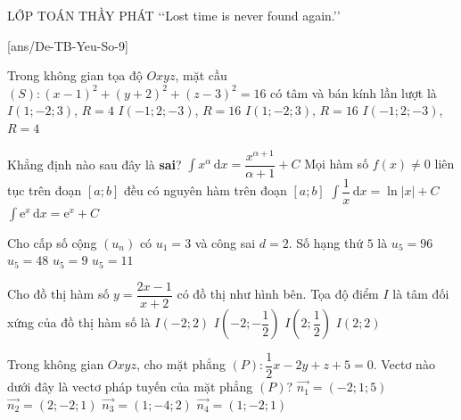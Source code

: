 \begin{name}
	{\tenchude}
	{\tendethi}
	{LỚP TOÁN THẦY PHÁT}
	{\lq\lq Lost time is never found again.\rq\rq}
\end{name}

[ans/De-TB-Yeu-So-9]
\TN
\begin{ex}
	Trong không gian tọa độ $Oxyz$, mặt cầu $(S)\colon {(x-1)}^2+{(y+2)}^2+{(z-3)}^2=16$ có tâm và bán kính lần lượt là
	\choice
	{\True $I(1;-2;3)$, $R=4$}
	{$I(-1;2;-3)$, $R=16$}
	{$I(1;-2;3)$, $R=16$}
	{$I(-1;2;-3)$, $R=4$}
\end{ex}

\begin{ex}
	Khẳng định nào sau đây là \textbf{sai}?
	\choice
	{\True $\displaystyle\int x^{\alpha}\mathrm{\,d}x=\dfrac{x^{\alpha+1}}{\alpha+1}+C$}
	{Mọi hàm số $f(x)\ne0$ liên tục trên đoạn $[a;b]$ đều có nguyên hàm trên đoạn $[a;b]$}
	{$\displaystyle\int \dfrac{1}{x}\mathrm{\,d}x=\ln |x|+C$}
	{$\displaystyle\int \mathrm{e}^x\mathrm{\,d}x=\mathrm{e}^x+C$}
\end{ex}

\begin{ex}
	Cho cấp số cộng $(u_n)$ có $u_1=3$ và công sai $d=2$. Số hạng thứ $5$ là
	\choice
	{$u_5=96$}
	{$u_5=48$}
	{$u_5=9$}
	{\True $u_5=11$}
\end{ex}

\begin{ex}
	Cho đồ thị hàm số $y=\dfrac{2x-1}{x+2}$ có đồ thị như hình bên. Tọa độ điểm $I$ là tâm đối xứng của đồ thị hàm số là
	\choice
	{\True $I(-2;2)$}
	{$I\left(-2;-\dfrac{1}{2}\right)$}
	{$I\left(2;\dfrac{1}{2}\right)$}
	{$I(2;2)$}
\end{ex}

\begin{ex}
	Trong không gian $Oxyz$, cho mặt phẳng $(P)\colon \dfrac{1}{2}x-2y+z+5=0$. Vectơ nào dưới đây là vectơ pháp tuyến của mặt phẳng $(P)$?
	\choice
	{$\vec{n_1}=(-2;1;5)$}
	{$\vec{n_2}=(2;-2;1)$}
	{\True $\vec{n_3}=(1;-4;2)$}
	{$\vec{n_4}=(1;-2;1)$}
\end{ex}

